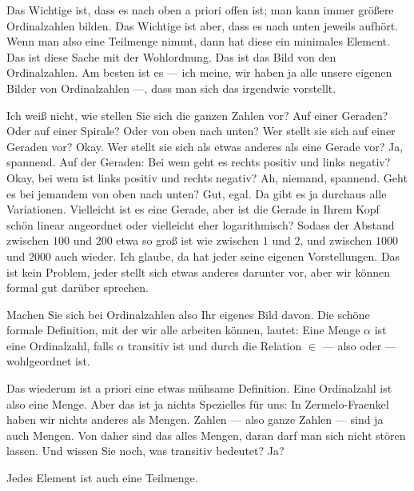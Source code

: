 \begin{spoken-clean}[00:07:15 - 00:08:45]
Das Wichtige ist, dass es nach oben a priori offen ist; man kann immer größere Ordinalzahlen bilden. Das Wichtige ist aber, dass es nach unten jeweils aufhört. Wenn man also eine Teilmenge nimmt, dann hat diese ein minimales Element. Das ist diese Sache mit der Wohlordnung. Das ist das Bild von den Ordinalzahlen. Am besten ist es --- ich meine, wir haben ja alle unsere eigenen Bilder von Ordinalzahlen ---, dass man sich das irgendwie vorstellt.

Ich weiß nicht, wie stellen Sie sich die ganzen Zahlen vor? Auf einer Geraden? Oder auf einer Spirale? Oder von oben nach unten? Wer stellt sie sich auf einer Geraden vor? Okay. Wer stellt sie sich als etwas anderes als eine Gerade vor? Ja, spannend. Auf der Geraden: Bei wem geht es rechts positiv und links negativ? Okay, bei wem ist links positiv und rechts negativ? Ah, niemand, spannend. Geht es bei jemandem von oben nach unten? Gut, egal. Da gibt es ja durchaus alle Variationen. Vielleicht ist es eine Gerade, aber ist die Gerade in Ihrem Kopf schön linear angeordnet oder vielleicht eher logarithmisch? Sodass der Abstand zwischen $100$ und $200$ etwa so groß ist wie zwischen $1$ und $2$, und zwischen $1000$ und $2000$ auch wieder. Ich glaube, da hat jeder seine eigenen Vorstellungen. Das ist kein Problem, jeder stellt sich etwas anderes darunter vor, aber wir können formal gut darüber sprechen.
\end{spoken-clean}

\begin{spoken-clean}[00:08:45 - 00:10:00]
Machen Sie sich bei Ordinalzahlen also Ihr eigenes Bild davon. Die schöne formale Definition, mit der wir alle arbeiten können, lautet: Eine Menge $\alpha$ ist eine Ordinalzahl, falls $\alpha$ transitiv ist und durch die Relation $\in$ --- also  oder  --- wohlgeordnet ist.

Das wiederum ist a priori eine etwas mühsame Definition. Eine Ordinalzahl ist also eine Menge. Aber das ist ja nichts Spezielles für uns: In Zermelo-Fraenkel haben wir nichts anderes als Mengen. Zahlen --- also ganze Zahlen --- sind ja auch Mengen. Von daher sind das alles Mengen, daran darf man sich nicht stören lassen. Und wissen Sie noch, was transitiv bedeutet? Ja?
\end{spoken-clean}

\begin{student-interaction}[Studentenantwort]
Jedes Element ist auch eine Teilmenge.
\end{student-interaction}

